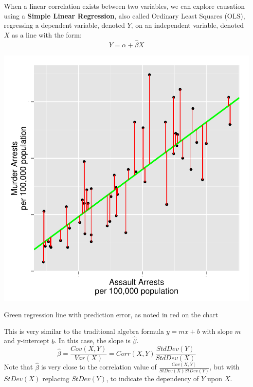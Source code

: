 \documentclass[nohyper,justified]{tufte-handout}\usepackage[]{graphicx}\usepackage[]{color}
\makeatletter
\def\maxwidth{ %
  \ifdim\Gin@nat@width>\linewidth
    \linewidth
  \else
    \Gin@nat@width
  \fi
}
\newenvironment{knitrout}{}{} %
\makeatother
\begin{document}
When a linear correlation exists between two variables, we can explore causation using a \textbf{Simple Linear Regression}, also called Ordinary Least Squares (OLS), regressing a dependent variable, denoted $Y$, on an independent variable, denoted $X$ as a line with the form:
\begin{equation*}
Y=\alpha + \hat{\beta}X
\end{equation*}
\begin{knitrout}
\color{fgcolor}\begin{marginfigure}

{\centering \includegraphics[width=\maxwidth]{figure/graphics-ols-1} 

}

\caption[Green regression line with prediction error, as noted in red on the chart]{Green regression line with prediction error, as noted in red on the chart}\label{fig:ols}
\end{marginfigure}


\end{knitrout}

This is very similar to the traditional algebra formula $y=mx+b$ with slope $m$ and y-intercept $b$. In this case, the slope is $\hat{\beta}$.
\begin{equation*}
\hat{\beta}=\frac{Cov(X,Y)}{Var(X)}=Corr(X,Y)\frac{StdDev(Y)}{StdDev(X)}
\end{equation*}
Note that $\hat{\beta}$ is very close to the correlation value of $\frac{Cov(X,Y)}{StDev(X)StDev(Y)}$, but with $StDev(X)$ replacing $StDev(Y)$, to indicate the dependency of $Y$ upon $X$.
\end{document}
